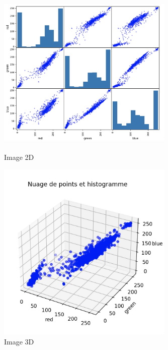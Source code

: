 \begin{figure}[!h]
    \begin{minipage}{.40\linewidth}
        \begin{center}
            \includegraphics[width=0.75\textwidth]{./img/5.1.2.jpg}
                \caption{\label{fig:1.2}Image 2D}  
            \end{center}
    \end{minipage}\hfill
    \begin{minipage}{.56\linewidth}
        \begin{center}
            \includegraphics[width=0.75\textwidth]{./img/5.1.1.jpg}
            \caption{\label{fig:1.2}Image 3D}  
        \end{center}
    \end{minipage}
\end{figure}

